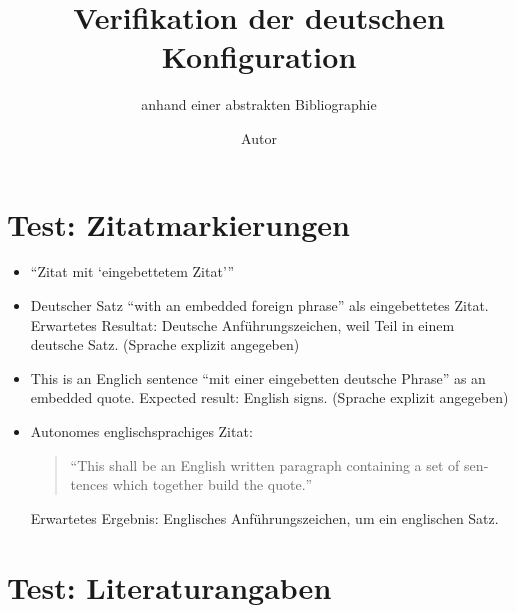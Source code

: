 \documentclass[
  DIV=calc,
  BCOR=5mm,
  11pt,
  headings=small,
  oneside,
  abstract=true,
  toc=bib,
  english,ngerman]{scrartcl}
\begin{document}
\nocite{*}

\titlehead{Bib\LaTeX}
\subject{Release }
\title{Verifikation der deutschen Konfiguration}
\subtitle{anhand einer abstrakten Bibliographie}
\author{Autor}


\maketitle

\footnotesize
\tableofcontents

\normalsize
\section{Test: Zitatmarkierungen}
\begin{itemize}

  \item \enquote{Zitat mit \enquote{eingebettetem Zitat}}

  \item Deutscher Satz \foreignquote{german}{with an embedded foreign phrase} als eingebettetes Zitat. Erwartetes Resultat: Deutsche Anführungszeichen, weil Teil in einem deutsche Satz. (Sprache explizit angegeben)

  \item This is an Englich sentence \foreignquote{english}{mit einer eingebetten deutsche Phrase} as an embedded quote. Expected result: English signs. (Sprache explizit angegeben)

  \item Autonomes englischsprachiges Zitat:
  \begin{quote}\foreignquote{english}{This shall be an English written paragraph containing a set of sentences which together build the quote.}\end{quote}

  Erwartetes Ergebnis: Englisches Anführungszeichen, um ein englischen Satz.
\end{itemize}

\section{Test: Literaturangaben}
\end{document}
